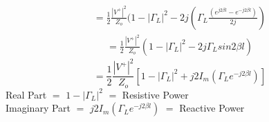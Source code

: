 \begin{align*} 
=\frac{1}{2} \frac{{ | V^+ | }^2}{Z_o} ( 1 - {|\Gamma_L}|^2 -2j(\Gamma_L \frac{ ( e^{j2\beta l} - e^{-j2\beta l})}{2j}) 
\end{align*}
\begin{align*} 
=\frac{1}{2} \frac{{ | V^+ | }^2}{Z_o} ( 1 - {|\Gamma_L}|^2 -2j\Gamma_L sin2\beta l ) 
\end{align*}
\begin{equation} 
=\frac{1}{2} \frac{{ | V^+ | }^2}{Z_o}  [1 - {|\Gamma_L}|^2 + j2I_m(\Gamma_Le^{-j2\beta l})]
\end{equation}
Real Part $=$ $1 - {|\Gamma_L}|^2$ $=$ Resistive Power\\
   
Imaginary Part $=$ $ j2I_m(\Gamma_Le^{-j2\beta l})$ $=$ Reactive Power\\
  
